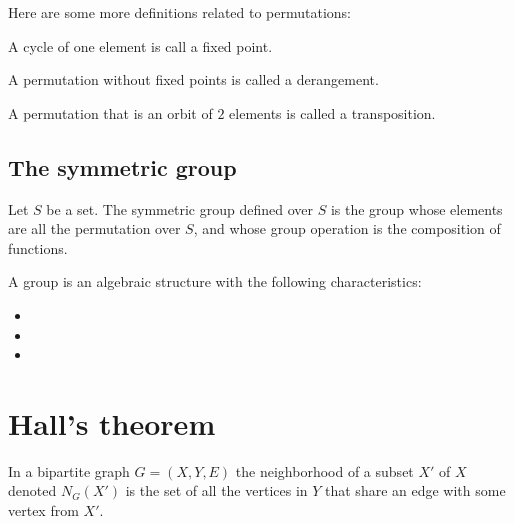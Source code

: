\documentclass[11pt,a4paper]{article}
\begin{document}
  Here are some more definitions related to permutations:

  \begin{definition}
		A cycle of one element is call a fixed point.
  \end{definition}

  \begin{definition}[Derangement]
		A permutation without fixed points is called a derangement.
  \end{definition}

  \begin{definition}[Transposition]
		A permutation that is an orbit of $2$ elements is called a transposition.
  \end{definition}
	
	\subsection{The symmetric group}
  \begin{definition}
    Let $S$ be a set.
    The symmetric group defined over $S$ is the group whose elements are
    all the permutation over $S$, and whose group operation is the
    composition of functions.
  \end{definition}

	\begin{remark}
	A group is an algebraic structure with the following 
	characteristics:
	\begin{itemize}
		\item {}
		\item {}
		\item {}
	\end{itemize}
	\end{remark}
		
	\newpage
	\section{Hall's theorem}
  \begin{definition}[Neighborhood]
		In a bipartite graph $G=(X,Y,E)$ the neighborhood of a subset
		$X'$ of $X$ denoted $N_G(X')$ is the set of all the vertices in 
		$Y$ that share an edge with some vertex from $X'$.
	\end{definition}
\end{document}
